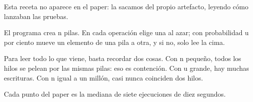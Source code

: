 Esta receta no aparece en el paper: la sacamos del propio artefacto, leyendo cómo lanzaban las pruebas.

El programa crea n pilas. En cada operación elige una al azar; con probabilidad u por ciento mueve un elemento de una pila a otra, y si no, solo lee la cima.

Para leer todo lo que viene, basta recordar dos cosas. Con n pequeño, todos los hilos se pelean por las mismas pilas: eso es contención. Con u grande, hay muchas escrituras. Con n igual a un millón, casi nunca coinciden dos hilos.

Cada punto del paper es la mediana de siete ejecuciones de diez segundos.
